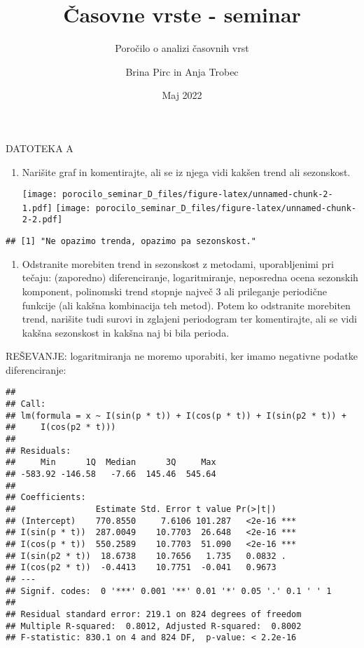 \documentclass[
]{article}
\title{Časovne vrste - seminar}
\subtitle{Poročilo o analizi časovnih vrst}
\author{Brina Pirc in Anja Trobec}
\date{Maj 2022}
\providecommand{\tightlist}{%
  \setlength{\itemsep}{0pt}\setlength{\parskip}{0pt}}
\begin{document}
\maketitle

DATOTEKA A

\begin{enumerate}
\def\labelenumi{\arabic{enumi}.}
\tightlist
\item
  Narišite graf in komentirajte, ali se iz njega vidi kakšen trend ali
  sezonskost.

  \texttt{[image: porocilo\_seminar\_D\_files/figure-latex/unnamed-chunk-2-1.pdf]}
  \texttt{[image: porocilo\_seminar\_D\_files/figure-latex/unnamed-chunk-2-2.pdf]}
\end{enumerate}

\begin{verbatim}
## [1] "Ne opazimo trenda, opazimo pa sezonskost."
\end{verbatim}

\begin{enumerate}
\def\labelenumi{\arabic{enumi}.}
\setcounter{enumi}{1}
\tightlist
\item
  Odstranite morebiten trend in sezonskost z metodami, uporabljenimi pri
  tečaju: (zaporedno) diferenciranje, logaritmiranje, neposredna ocena
  sezonskih komponent, polinomski trend stopnje največ 3 ali prileganje
  periodične funkcije (ali kakšna kombinacija teh metod). Potem ko
  odstranite morebiten trend, narišite tudi surovi in zglajeni
  periodogram ter komentirajte, ali se vidi kakšna sezonskost in kakšna
  naj bi bila perioda.
\end{enumerate}

REŠEVANJE: logaritmiranja ne moremo uporabiti, ker imamo negativne
podatke diferenciranje:

\begin{verbatim}
## 
## Call:
## lm(formula = x ~ I(sin(p * t)) + I(cos(p * t)) + I(sin(p2 * t)) + 
##     I(cos(p2 * t)))
## 
## Residuals:
##     Min      1Q  Median      3Q     Max 
## -583.92 -146.58   -7.66  145.46  545.64 
## 
## Coefficients:
##                Estimate Std. Error t value Pr(>|t|)    
## (Intercept)    770.8550     7.6106 101.287   <2e-16 ***
## I(sin(p * t))  287.0049    10.7703  26.648   <2e-16 ***
## I(cos(p * t))  550.2589    10.7703  51.090   <2e-16 ***
## I(sin(p2 * t))  18.6738    10.7656   1.735   0.0832 .  
## I(cos(p2 * t))  -0.4413    10.7751  -0.041   0.9673    
## ---
## Signif. codes:  0 '***' 0.001 '**' 0.01 '*' 0.05 '.' 0.1 ' ' 1
## 
## Residual standard error: 219.1 on 824 degrees of freedom
## Multiple R-squared:  0.8012, Adjusted R-squared:  0.8002 
## F-statistic: 830.1 on 4 and 824 DF,  p-value: < 2.2e-16
\end{verbatim}
\end{document}
